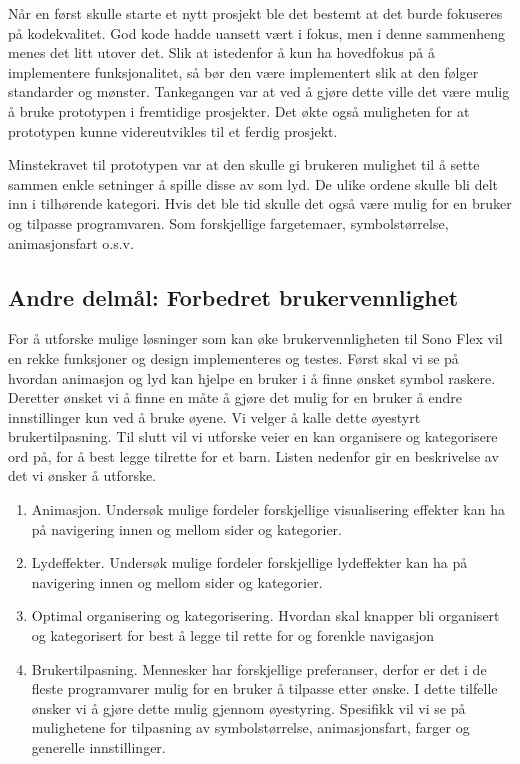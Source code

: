 Når en først skulle starte et nytt prosjekt ble det bestemt at det burde fokuseres på kodekvalitet. God kode hadde uansett vært i fokus, men i denne sammenheng menes det litt utover det. Slik at istedenfor å kun ha hovedfokus på å implementere funksjonalitet, så bør den være implementert slik at den følger standarder og mønster. Tankegangen var at ved å gjøre dette ville det være mulig å bruke prototypen i fremtidige prosjekter. Det økte også muligheten for at prototypen kunne videreutvikles til et ferdig prosjekt. 

Minstekravet til prototypen var at den skulle gi brukeren mulighet til å sette sammen enkle setninger å spille disse av som lyd. De ulike ordene skulle bli delt inn i tilhørende kategori. Hvis det ble tid skulle det også være mulig for en bruker og tilpasse programvaren. Som forskjellige fargetemaer, symbolstørrelse, animasjonsfart o.s.v.


\subsection{Andre delmål: Forbedret brukervennlighet}
\label{sec:ResearchQuestion}

For å utforske mulige løsninger som kan øke brukervennligheten til Sono Flex vil en rekke funksjoner og design implementeres og testes. Først skal vi se på hvordan animasjon og lyd kan hjelpe en bruker i å finne ønsket symbol raskere. Deretter ønsket vi å finne en måte å gjøre det mulig for en bruker å endre innstillinger kun ved å bruke øyene. Vi velger å kalle dette øyestyrt brukertilpasning. Til slutt vil vi utforske veier en kan organisere og kategorisere ord på, for å best legge tilrette for et barn. Listen nedenfor gir en  beskrivelse av det vi ønsker å utforske.

\begin{enumerate} 
\label{lst:features}
\item Animasjon. Undersøk mulige fordeler forskjellige visualisering effekter kan ha på navigering innen og mellom sider og kategorier.
\item Lydeffekter. Undersøk mulige fordeler forskjellige lydeffekter kan ha på navigering innen og mellom sider og kategorier.
\item Optimal organisering og kategorisering. Hvordan skal knapper bli organisert og kategorisert for best å legge til rette for og forenkle navigasjon
\item Brukertilpasning. Mennesker har forskjellige preferanser, derfor er det i de fleste programvarer mulig for en bruker å tilpasse etter ønske. I dette tilfelle ønsker vi å gjøre dette mulig gjennom øyestyring. Spesifikk vil vi se på mulighetene for tilpasning av symbolstørrelse, animasjonsfart, farger og generelle innstillinger. 
\end{enumerate}

